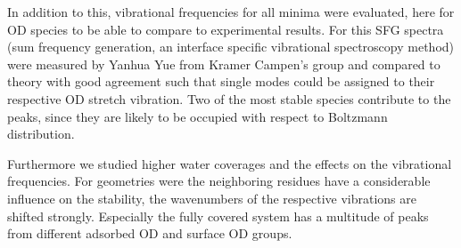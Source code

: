 \documentclass[11pt,DIV=13,a4paper,headinclude]{scrartcl}
\begin{document}
In addition to this, vibrational frequencies for all minima were evaluated, here for OD species to be able to compare to experimental results.
For this SFG spectra (sum frequency generation, an interface specific vibrational spectroscopy method) were measured by Yanhua Yue from Kramer Campen's group and compared to theory with good agreement such that single modes could be assigned to their respective OD stretch vibration.
Two of the most stable species contribute to the peaks, since they are likely to be occupied with respect to Boltzmann distribution.

Furthermore we studied higher water coverages and the effects on the vibrational frequencies.
For geometries were the neighboring residues have a considerable influence on the stability, the wavenumbers of the respective vibrations are shifted strongly.
Especially the fully covered system has a multitude of peaks from different adsorbed OD and surface OD groups.
\end{document}
